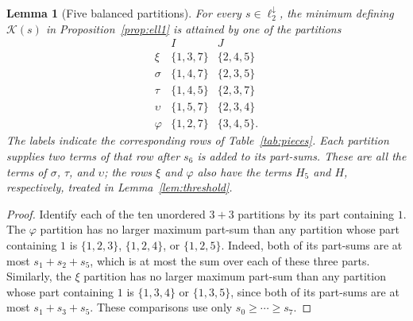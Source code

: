 \documentclass[12pt]{amsart}
\newtheorem{lemma}[theorem]{Lemma}
\theoremstyle{definition}
\theoremstyle{remark}
\numberwithin{equation}{section}
\numberwithin{figure}{section}
\numberwithin{table}{section}
\newcommand{\KK}{\mathcal K}
\begin{document}
\begin{lemma}[Five balanced partitions]\label{lem:five-partitions}
For every $s\in\ell_2^\downarrow$, the minimum defining $\KK(s)$ in
Proposition~\ref{prop:ell1} is attained by one of the partitions
\[
\begin{array}{c|c|c}
& I&J\\\hline
\xi&\{1,3,7\}&\{2,4,5\}\\
\sigma&\{1,4,7\}&\{2,3,5\}\\
\tau&\{1,4,5\}&\{2,3,7\}\\
\upsilon&\{1,5,7\}&\{2,3,4\}\\
\varphi&\{1,2,7\}&\{3,4,5\}.
\end{array}
\]
The labels indicate the corresponding rows of Table~\ref{tab:pieces}. Each
partition supplies two terms of that row after $s_6$ is added to its
part-sums. These are all the terms of $\sigma$, $\tau$, and $\upsilon$; the
rows $\xi$ and $\varphi$ also have the terms $H_5$ and $H$,
respectively, treated in Lemma~\ref{lem:threshold}.
\end{lemma}
\begin{proof}
Identify each of the ten unordered $3+3$ partitions by its part containing
$1$. The $\varphi$ partition has no larger maximum part-sum than any
partition whose part containing $1$ is $\{1,2,3\}$, $\{1,2,4\}$, or
$\{1,2,5\}$. Indeed, both of its part-sums are at most $s_1+s_2+s_5$, which
is at most the sum over each of these three parts. Similarly, the $\xi$
partition has no larger maximum part-sum than any partition whose part
containing $1$ is $\{1,3,4\}$ or $\{1,3,5\}$, since both of its part-sums are
at most $s_1+s_3+s_5$. These comparisons use only $s_0\ge\cdots\ge s_7$.
\end{proof}
\end{document}
